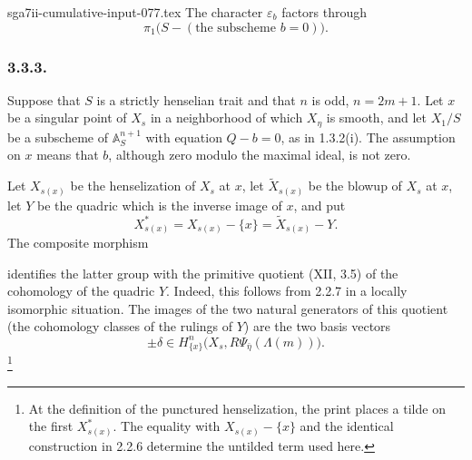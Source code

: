 \begin{filecontents*}{sga7ii-cumulative-input-077.tex}
The character $\varepsilon_b$ factors through
\[
\pi_1\bigl(S-(\text{the subscheme }b=0)\bigr).
\]

\subsubsection*{3.3.3.}
Suppose that $S$ is a strictly henselian trait and that $n$ is odd,
$n=2m+1$.  Let $x$ be a singular point of $X_s$ in a neighborhood
of which $X_\eta$ is smooth, and let $X_1/S$ be a subscheme of
$\mathbb A^{n+1}_S$ with equation $Q-b=0$, as in 1.3.2(i).  The
assumption on $x$ means that $b$, although zero modulo the maximal
ideal, is not zero.

Let $X_{s(x)}$ be the henselization of $X_s$ at $x$, let
$\widetilde X_{s(x)}$ be the blowup of $X_s$ at $x$, let $Y$ be the
quadric which is the inverse image of $x$, and put
\[
X^*_{s(x)}=X_{s(x)}-\{x\}=\widetilde X_{s(x)}-Y.
\]
The composite morphism
\begin{center}
\end{center}
identifies the latter group with the primitive quotient (XII, 3.5)
of the cohomology of the quadric $Y$.  Indeed, this follows from
2.2.7 in a locally isomorphic situation.  The images of the two
natural generators of this quotient (the cohomology classes of the
rulings of $Y$) are the two basis vectors
\[
\pm\delta\in
H^n_{\{x\}}\bigl(X_s,R\Psi_{\bar\eta}(\Lambda(m))\bigr).
\]
\footnote{At the definition of the punctured henselization, the print
places a tilde on the first $X^*_{s(x)}$.  The equality with
$X_{s(x)}-\{x\}$ and the identical construction in 2.2.6 determine
the untilded term used here.}
\end{filecontents*}
